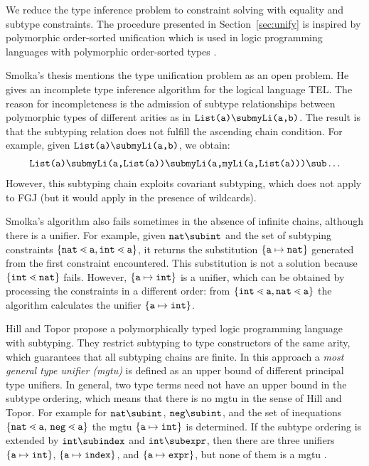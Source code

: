 We reduce the type inference problem to constraint solving with
equality and subtype constraints.
The procedure presented in Section~\ref{sec:unify} is inspired by
polymorphic order-sorted unification which is used in logic 
programming languages with polymorphic order-sorted types
\cite{GS89,MH91,HiTo92,CB95}.

Smolka's thesis \cite{GS89} mentions the type unification problem
as an open problem. He gives  an incomplete type inference algorithm
for the logical language \textsf{TEL}. The reason for incompleteness
is the admission of subtype relationships between polymorphic types of
different arities as in  $\texttt{List(a)} \sub
\texttt{myLi(a,b)}$. The result is that the subtyping relation does
not fulfill the ascending chain condition.
For example, given  $\texttt{List(a)} \sub \texttt{myLi(a,b)}$, we obtain:
\begin{gather*}
  \texttt{List(a)} \sub \texttt{myLi(a,List(a))} \sub \texttt{myLi(a,myLi(a,List(a)))}  \sub \dots
\end{gather*}
However, this subtyping chain exploits covariant subtyping, which does
not apply to FGJ (but it would apply in the presence of wildcards).

Smolka's algorithm also fails sometimes in the absence of infinite
chains, although there is a unifier. 
For example, given $\texttt{nat} \sub \texttt{int}$ and the set
of subtyping constraints $\{ \mathtt{nat} \lessdot \mathtt{a},
  \mathtt{int} \lessdot \mathtt{a} \}$, it returns the substitution
$\{ \mathtt{a} \mapsto \mathtt{nat} \}$ generated from the first
constraint encountered. This substitution is not a solution
because $\{ \mathtt{int} \lessdot \mathtt{nat} \}$ fails.
However, $\{ \mathtt{a}\mapsto \mathtt{int} \}$ is a unifier, which
can be obtained by processing the constraints in a different order: from $\{ \mathtt{int} \lessdot \mathtt{a}, \mathtt{nat} \lessdot
  \mathtt{a} \}$ the algorithm calculates the unifier 
$\{ \mathtt{a}\mapsto \mathtt{int} \}$.

Hill and Topor  \cite{HiTo92} propose a polymorphically typed logic
programming language with subtyping. They restrict subtyping to type
constructors of the same arity,  which guarantees that all subtyping
chains are finite.
In this approach a \emph{most general type unifier (mgtu)} is
defined as an upper bound of different principal type unifiers. In
general, two type terms need not have an upper bound in the subtype ordering,
which means that there is no mgtu in the sense of Hill and Topor.
For example for  $\texttt{nat} \sub \texttt{int}$, $\texttt{neg} 
\sub \texttt{int}$, and the set of inequations $\set{\mathtt{nat} \lessdot
  \mathtt{a}$, $\mathtt{neg} \lessdot \mathtt{a}}$ the mgtu $\{ \mathtt{a} \mapsto \texttt{int} \}$ is
determined. If the subtype ordering is extended by $\mathtt{int} \sub
\mathtt{index}$ and $\mathtt{int} \sub \mathtt{expr}$, then there are three
unifiers $\{ \mathtt{a} \mapsto \texttt{int} \}$, $\{ \mathtt{a} \mapsto
  \mathtt{index} \}$, and $\{ \mathtt{a} \mapsto 
\mathtt{expr} \}$, but none of them is a mgtu \cite{HiTo92}.

